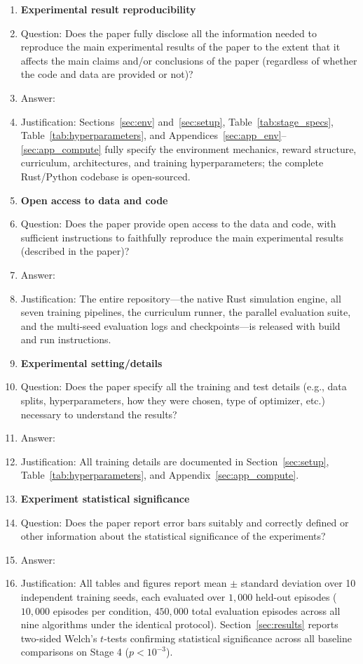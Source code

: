 \begin{enumerate}
\item {\bf Experimental result reproducibility}
    \item[] Question: Does the paper fully disclose all the information needed to reproduce the main experimental results of the paper to the extent that it affects the main claims and/or conclusions of the paper (regardless of whether the code and data are provided or not)?
    \item[] Answer: \answerYes{}
    \item[] Justification: Sections~\ref{sec:env} and~\ref{sec:setup}, Table~\ref{tab:stage_specs}, Table~\ref{tab:hyperparameters}, and Appendices~\ref{sec:app_env}--\ref{sec:app_compute} fully specify the environment mechanics, reward structure, curriculum, architectures, and training hyperparameters; the complete Rust/Python codebase is open-sourced.

\item {\bf Open access to data and code}
    \item[] Question: Does the paper provide open access to the data and code, with sufficient instructions to faithfully reproduce the main experimental results (described in the paper)?
    \item[] Answer: \answerYes{}
    \item[] Justification: The entire repository---the native Rust simulation engine, all seven training pipelines, the curriculum runner, the parallel evaluation suite, and the multi-seed evaluation logs and checkpoints---is released with build and run instructions.

\item {\bf Experimental setting/details}
    \item[] Question: Does the paper specify all the training and test details (e.g., data splits, hyperparameters, how they were chosen, type of optimizer, etc.) necessary to understand the results?
    \item[] Answer: \answerYes{}
    \item[] Justification: All training details are documented in Section~\ref{sec:setup}, Table~\ref{tab:hyperparameters}, and Appendix~\ref{sec:app_compute}.

\item {\bf Experiment statistical significance}
    \item[] Question: Does the paper report error bars suitably and correctly defined or other information about the statistical significance of the experiments?
    \item[] Answer: \answerYes{}
    \item[] Justification: All tables and figures report mean $\pm$ standard deviation over 10 independent training seeds, each evaluated over $1,\!000$ held-out episodes ($10,\!000$ episodes per condition, $450,\!000$ total evaluation episodes across all nine algorithms under the identical protocol). Section~\ref{sec:results} reports two-sided Welch's $t$-tests confirming statistical significance across all baseline comparisons on Stage 4 ($p < 10^{-3}$).


\end{enumerate}
